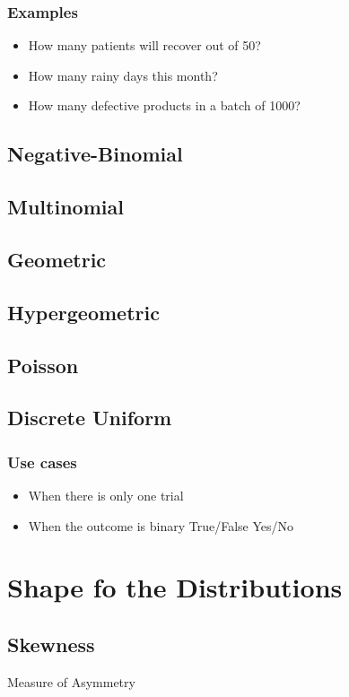 \documentclass[12pt]{extarticle}
\begin{document}
\subsubsection{Examples}
\begin{itemize}
    \item How many patients will recover out of 50?
    \item How many rainy days this month?
    \item How many defective products in a batch of 1000?
\end{itemize}

\subsection{Negative-Binomial}
\subsection{Multinomial}
\subsection{Geometric}
\subsection{Hypergeometric}
\subsection{Poisson}
\subsection{Discrete Uniform}



\subsubsection{Use cases}
\begin{itemize}
    \item When there is only one trial
    \item When the outcome is binary True/False Yes/No 
\end{itemize}




\section{Shape fo the Distributions}
\subsection{Skewness} 
Measure of Asymmetry  
\end{document}
